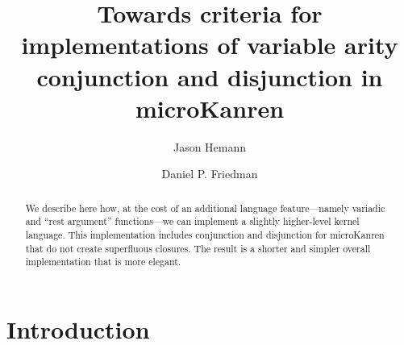 \documentclass[sigplan,screen,draft,anonymous,review,natbib=false]{acmart}
\begin{document}
\title[Towards criteria for implementations]{Towards criteria for
  implementations of variable arity conjunction and disjunction in
  microKanren}

\author{Jason Hemann}
\author{Daniel P. Friedman}

\renewcommand{\shortauthors}{Hemann et al.}

\begin{abstract}
  We describe here how, at the cost of an additional language
  feature---namely variadic and \enquote{rest argument} functions---we
  can implement a slightly higher-level kernel language. This
  implementation includes conjunction and disjunction for microKanren
  that do not create superfluous closures. The result is a
  shorter and simpler overall implementation that is more elegant.
\end{abstract}


\keywords{}

\maketitle

\section{Introduction}
\end{document}
